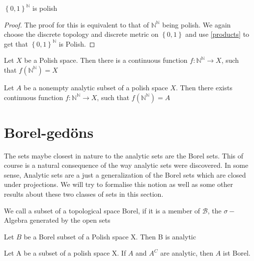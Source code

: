 \documentclass[10pt, a4paper, titlepage]{article}
\numberwithin{equation}{section}
\begin{document}
\begin{theorem}
	$\left\{ 0,1 \right\}^\mathbb{N}$ is polish
\end{theorem}
\begin{proof}
	The proof for this is equivalent to that of $\mathbb{N}^{\mathbb{N}}$ being polish. We again choose the discrete topology and discrete metric on $\left\{ 0,1 \right\} $ and use \ref{products} to get that $\left\{ 0,1 \right\} ^{\mathbb{N}} $ is Polish.	
\end{proof}


\begin{theorem}
	Let $X$ be a Polish space. Then there is a continuous function $f: \mathbb{N}^\mathbb{N} \to X $, such that $f\left( \mathbb{N}^\mathbb{N} \right) = X$
\end{theorem}


\begin{theorem}
	Let $A$ be a nonempty analytic subset of a polish space $X$. Then there exists continuous function $f: \mathbb{N}^{\mathbb{N}} \to X$, such that $f\left( \mathbb{N}^{\mathbb{N}} \right) = A$
\end{theorem}



\section{Borel-gedöns}
The sets maybe closest in nature to the analytic sets are the Borel sets. 
This of course is a natural consequence of the way analytic sets were discovered. 
In some sense, Analytic sets are a just a generalization of the Borel sets which are closed under projections. 
We will try to formalise this notion as well as some other results about these two classes of sets in this section.

\begin{definition}
	We call a subset of a topological space Borel, if it is a member of $\mathcal{B}$, the $\sigma-$Algebra generated by the open sets
\end{definition}


\begin{theorem}
	Let $B$ be a Borel subset of a Polish space X. Then B is analytic		
\end{theorem}

\begin{theorem}
	Let A be a subset of a polish space X. If $A$ and  $A^{C}$ are analytic, then $A$ ist Borel.  
\end{theorem}
\end{document}
